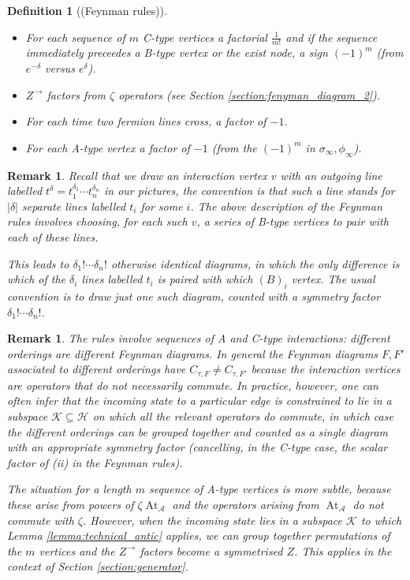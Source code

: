 \documentclass[english,letter paper,12pt,leqno]{article}
\theoremstyle{example}
\newtheorem{definition}[theorem]{Definition}
\newtheorem{remark}[theorem]{Remark}
\numberwithin{equation}{section}
\def\AA{\mathcal{A}}
\def\HH{\HH}
\def\HH{\mathcal{H}}
\def\KK{\mathcal{K}}
\DeclareMathOperator{\vAt}{At}
\begin{document}
\begin{definition}[(Feynman rules)]
\begin{itemize}
\item[(ii)] For each sequence of $m$ C-type vertices a factorial $\frac{1}{m!}$ and if the sequence immediately preceedes a B-type vertex or the exist node, a sign $(-1)^m$ (from $e^{-\delta}$ versus $e^\delta$).
\item[(iii)] $Z^{\,\rightarrow}$ factors from $\zeta$ operators (see Section \ref{section:fenyman_diagram_2}).
\item[(iv)] For each time two fermion lines cross, a factor of $-1$.
\item[(v)] For each A-type vertex a factor of $-1$ (from the $(-1)^m$ in $\sigma_\infty,\phi_\infty$).
\end{itemize}
\end{definition}

\begin{remark}\label{remark:boson_symmetry} Recall that we draw an interaction vertex $v$ with an outgoing line labelled $t^\delta = t_1^{\delta_1} \cdots t_n^{\delta_n}$ in our pictures, the convention is that such a line stands for $|\delta|$ separate lines labelled $t_i$ for some $i$. The above description of the Feynman rules involves choosing, for each such $v$, a series of B-type vertices to pair with each of these lines. 

This leads to $\delta_1! \cdots \delta_n!$ otherwise identical diagrams, in which the only difference is \emph{which} of the $\delta_i$ lines labelled $t_i$ is paired with which $(B)_i$ vertex. The usual convention is to draw just one such diagram, counted with a symmetry factor $\delta_1! \cdots \delta_n!$.
\end{remark}

\begin{remark}\label{remark:symmetry_A_type} The rules involve \emph{sequences} of A and C-type interactions: different orderings are different Feynman diagrams. In general the Feynman diagrams $F,F'$ associated to different orderings have $C_{\tau, F} \neq C_{\tau, F'}$ because the interaction vertices are operators that do not necessarily commute. In practice, however, one can often infer that the incoming state to a particular edge is constrained to lie in a subspace $\KK \subseteq \HH$ on which all the relevant operators \emph{do} commute, in which case the different orderings can be grouped together and counted as a single diagram with an appropriate symmetry factor (cancelling, in the C-type case, the scalar factor of (ii) in the Feynman rules).

The situation for a length $m$ sequence of A-type vertices is more subtle, because these arise from powers of $\zeta \vAt_{\AA}$ and the operators arising from $\vAt_{\AA}$ do not commute with $\zeta$. However, when the incoming state lies in a subspace $\KK$ to which Lemma \ref{lemma:technical_antic} applies, we can group together permutations of the $m$ vertices and the $Z^{\,\rightarrow}$ factors become a symmetrised $Z$. This applies in the context of Section \ref{section:generator}.
\end{remark}
\end{document}
